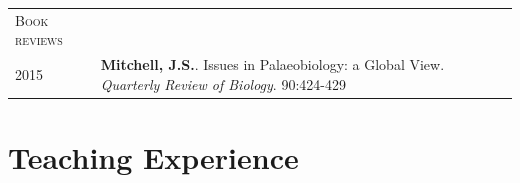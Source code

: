 \documentclass[a4paper, oneside, final]{scrartcl} %
\newcommand{\gray}{\rowcolor[gray]{.90}} %
\begin{document}
\begin{center}

\begin{tabularx}{0.97\linewidth}{>{\raggedleft\scshape}p{2cm}X}
Book reviews & \\
2015 & \textbf{Mitchell, J.S.}. Issues in Palaeobiology: a Global View. \textit{Quarterly Review of Biology}. 90:424-429 \\
\end{tabularx}




\section{Teaching Experience}


\end{center}
\end{document}
